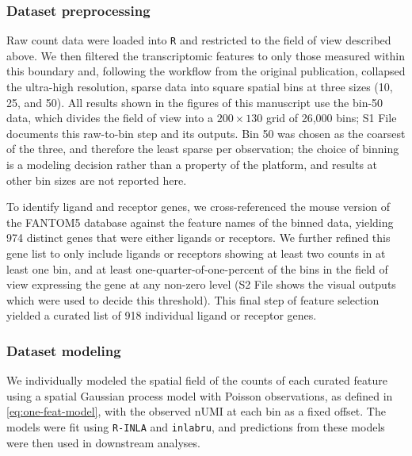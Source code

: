 \documentclass[10pt,letterpaper]{article}
\begin{document}
\subsubsection*{Dataset preprocessing}

Raw count data were loaded into \texttt{R} and restricted to the field of view described above. We then filtered the transcriptomic features to only those measured within this boundary and, following the workflow from the original publication, collapsed the ultra-high resolution, sparse data into square spatial bins at three sizes (10, 25, and 50). All results shown in the figures of this manuscript use the bin-50 data, which divides the field of view into a $200\times130$ grid of 26,000 bins; S1 File documents this raw-to-bin step and its outputs. Bin 50 was chosen as the coarsest of the three, and therefore the least sparse per observation; the choice of binning is a modeling decision rather than a property of the platform, and results at other bin sizes are not reported here.

To identify ligand and receptor genes, we cross-referenced the mouse version of the FANTOM5 database \cite{Ramilowski2015} against the feature names of the binned data, yielding 974 distinct genes that were either ligands or receptors. We further refined this gene list to only include ligands or receptors showing at least two counts in at least one bin, and at least one-quarter-of-one-percent of the bins in the field of view expressing the gene at any non-zero level (S2 File shows the visual outputs which were used to decide this threshold). This final step of feature selection yielded a curated list of 918 individual ligand or receptor genes.

\subsubsection*{Dataset modeling}\label{sec:meth-models}

We individually modeled the spatial field of the counts of each curated feature using a spatial Gaussian process model with Poisson observations, as defined in \eqref{eq:one-feat-model}, with the observed nUMI at each bin as a fixed offset. The models were fit using \texttt{R-INLA} and \texttt{inlabru}, and predictions from these models were then used in downstream analyses.
\end{document}
